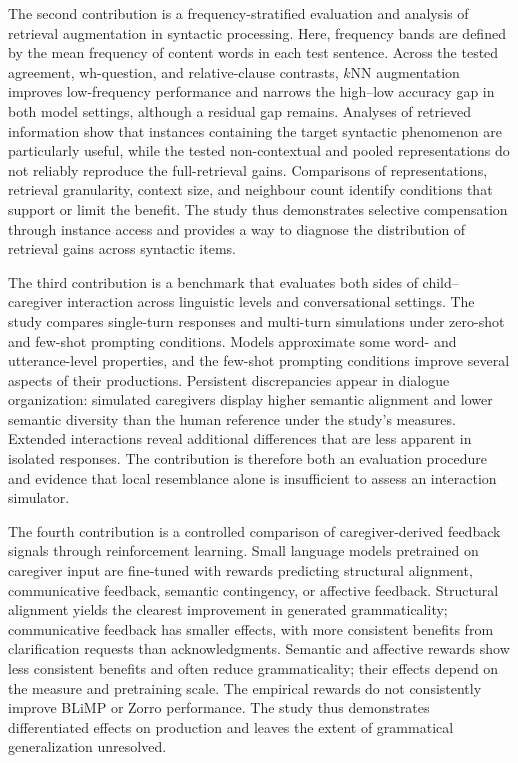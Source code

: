 The second contribution is a frequency-stratified evaluation and analysis of retrieval augmentation in syntactic processing. Here, frequency bands are defined by the mean frequency of content words in each test sentence. Across the tested agreement, wh-question, and relative-clause contrasts, $k$NN augmentation improves low-frequency performance and narrows the high--low accuracy gap in both model settings, although a residual gap remains. Analyses of retrieved information show that instances containing the target syntactic phenomenon are particularly useful, while the tested non-contextual and pooled representations do not reliably reproduce the full-retrieval gains. Comparisons of representations, retrieval granularity, context size, and neighbour count identify conditions that support or limit the benefit. The study thus demonstrates selective compensation through instance access and provides a way to diagnose the distribution of retrieval gains across syntactic items.

The third contribution is a benchmark that evaluates both sides of child--caregiver interaction across linguistic levels and conversational settings. The study compares single-turn responses and multi-turn simulations under zero-shot and few-shot prompting conditions. Models approximate some word- and utterance-level properties, and the few-shot prompting conditions improve several aspects of their productions. Persistent discrepancies appear in dialogue organization: simulated caregivers display higher semantic alignment and lower semantic diversity than the human reference under the study's measures. Extended interactions reveal additional differences that are less apparent in isolated responses. The contribution is therefore both an evaluation procedure and evidence that local resemblance alone is insufficient to assess an interaction simulator.

The fourth contribution is a controlled comparison of caregiver-derived feedback signals through reinforcement learning. Small language models pretrained on caregiver input are fine-tuned with rewards predicting structural alignment, communicative feedback, semantic contingency, or affective feedback. Structural alignment yields the clearest improvement in generated grammaticality; communicative feedback has smaller effects, with more consistent benefits from clarification requests than acknowledgments. Semantic and affective rewards show less consistent benefits and often reduce grammaticality; their effects depend on the measure and pretraining scale. The empirical rewards do not consistently improve BLiMP or Zorro performance. The study thus demonstrates differentiated effects on production and leaves the extent of grammatical generalization unresolved.

